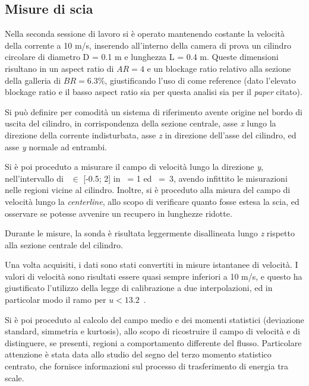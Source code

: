 \documentclass{article} %
\newcommand{\mps}{\ \nicefrac{\textrm{m}}{\textrm{s}}}
\newcommand{\xd}{\nicefrac{\textrm{x}}{\textrm{D}}\ }
\newcommand{\yd}{\nicefrac{\textrm{y}}{\textrm{D}}\ }
\begin{document}
\subsection{Misure di scia}
Nella seconda sessione di lavoro si è operato mantenendo costante la velocità della corrente a 10 m/s, inserendo all'interno della camera di prova un cilindro circolare di diametro D = 0.1 m e lunghezza L = 0.4 m. Queste dimensioni risultano in un aspect ratio di $AR = 4$ e un blockage ratio relativo alla sezione della galleria di $BR = 6.3 \%$, giustificando l'uso di \cite{braza06} come reference (dato l'elevato blockage ratio e il basso aspect ratio sia per questa analisi sia per il \textit{paper} citato).\par
Si può definire per comodità un sistema di riferimento avente origine nel bordo di uscita del cilindro, in corrispondenza della sezione centrale, asse \textit{x} lungo la direzione della corrente indisturbata, asse \textit{z} in direzione dell'asse del cilindro, ed asse \textit{y} normale ad entrambi.\par
Si è poi proceduto a misurare il campo di velocità lungo la direzione \textit{y}, nell'intervallo di \yd $\in$ [-0.5; 2] in \xd = 1 ed \mbox{\xd = 3}, avendo infittito le misurazioni nelle regioni vicine al cilindro. Inoltre, si è proceduto alla misura del campo di velocità lungo la \textit{centerline}, allo scopo di verificare quanto fosse estesa la scia, ed osservare se potesse avvenire un recupero in lunghezze ridotte.\par
Durante le misure, la sonda è risultata leggermente disallineata lungo \textit{z} rispetto alla sezione centrale del cilindro.\par
Una volta acquisiti, i dati sono stati convertiti in misure istantanee di velocità. I valori di velocità sono risultati essere quasi sempre inferiori a 10 m/s, e questo ha giustificato l'utilizzo della legge di calibrazione a due interpolazioni, ed in particolar modo il ramo per $u < 13.2$\mps.\par
Si è poi proceduto al calcolo del campo medio e dei momenti statistici (deviazione standard, simmetria e kurtosis), allo scopo di ricostruire il campo di velocità e di distinguere, se presenti, regioni a comportamento differente del flusso. Particolare attenzione è stata data allo studio del segno del terzo momento statistico centrato, che fornisce informazioni sul processo di trasferimento di energia tra scale.
\clearpage
\end{document}
